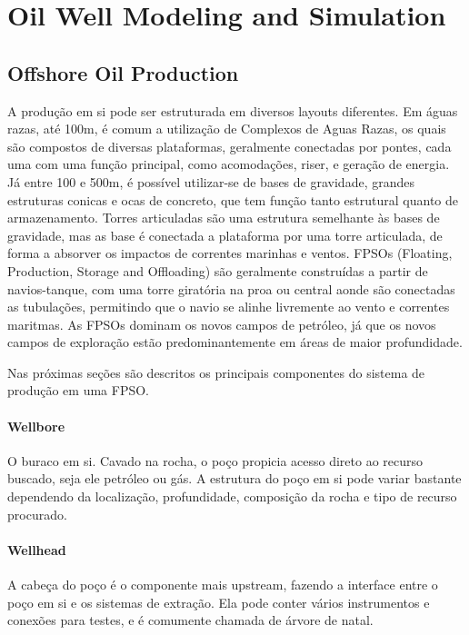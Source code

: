 

\chapter{Oil Well Modeling and Simulation} \label{chap:2}


\section{Offshore Oil Production}

A produção em si pode ser estruturada em diversos layouts diferentes. Em águas razas, até 100m, é comum a utilização de Complexos de Aguas Razas, os quais são compostos de diversas plataformas, geralmente conectadas por pontes, cada uma com uma função principal, como acomodações, riser, e geração de energia.
Já entre 100 e 500m, é possível utilizar-se de bases de gravidade, grandes estruturas conicas e ocas de concreto, que tem função tanto estrutural quanto de armazenamento. Torres articuladas são uma estrutura semelhante às bases de gravidade, mas as base é conectada a plataforma por uma torre articulada, de forma a absorver os impactos de correntes marinhas e ventos.
FPSOs (Floating, Production, Storage and Offloading) são geralmente construídas a partir de navios-tanque, com uma torre giratória na proa ou central aonde são conectadas as tubulações, permitindo que o navio se alinhe livremente ao vento e correntes maritmas. As FPSOs dominam os novos campos de petróleo, já que os novos campos de exploração estão predominantemente em áreas de maior profundidade.

Nas próximas seções são descritos os principais componentes do sistema de produção em uma FPSO.

\subsubsection{Wellbore}

O buraco em si. Cavado na rocha, o poço propicia acesso direto ao recurso buscado, seja ele petróleo ou gás. A estrutura do poço em si pode variar bastante dependendo da localização, profundidade, composição da rocha e tipo de recurso procurado.
 \\

\subsubsection{Wellhead}
A cabeça do poço é o componente mais upstream, fazendo a interface entre o poço em si e os sistemas de extração. Ela pode conter vários instrumentos e conexões para testes, e é comumente chamada de árvore de natal.

